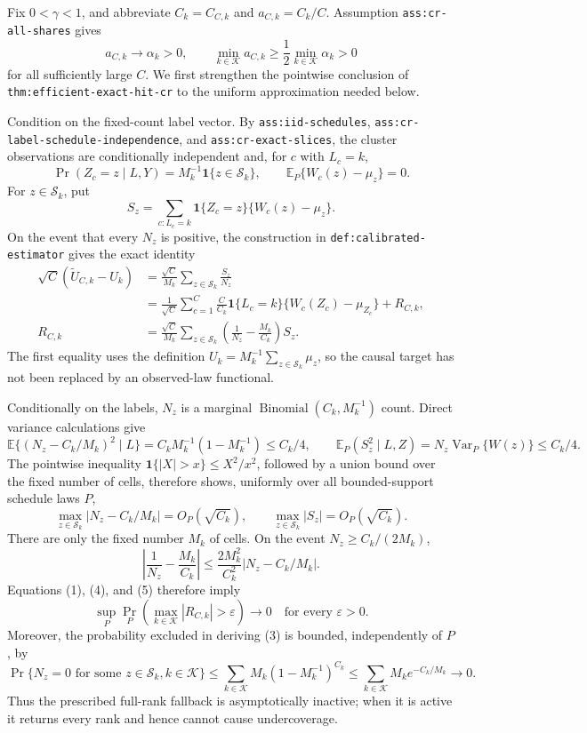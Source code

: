 Fix \(0<\gamma<1\), and abbreviate \(C_k=C_{C,k}\) and \(a_{C,k}=C_k/C\).  Assumption \texttt{ass:cr-all-shares} gives
\[
 a_{C,k}\longrightarrow\alpha_k>0,
 \qquad
 \min_{k\in\mathcal K}a_{C,k}\geq \frac12\min_{k\in\mathcal K}\alpha_k>0
 \tag{1}
\]
for all sufficiently large \(C\).  We first strengthen the pointwise conclusion of \texttt{thm:efficient-exact-hit-cr} to the uniform approximation needed below.

Condition on the fixed-count label vector.  By \texttt{ass:iid-schedules}, \texttt{ass:cr-label-schedule-independence}, and \texttt{ass:cr-exact-slices}, the cluster observations are conditionally independent and, for \(c\) with \(L_c=k\),
\[
 \Pr(Z_c=z\mid L,Y)=M_k^{-1}\mathbf 1\{z\in\mathcal S_k\},
 \qquad
 \mathbb E_P\{W_c(z)-\mu_z\}=0.
 \tag{2}
\]
For \(z\in\mathcal S_k\), put
\[
 S_z=\sum_{c:L_c=k}\mathbf 1\{Z_c=z\}\{W_c(z)-\mu_z\}.
\]
On the event that every \(N_z\) is positive, the construction in \texttt{def:calibrated-estimator} gives the exact identity
\[
 \begin{split}
 \sqrt C(\widetilde U_{C,k}-U_k)
 &=\frac{\sqrt C}{M_k}\sum_{z\in\mathcal S_k}\frac{S_z}{N_z}\\
 &=\frac1{\sqrt C}\sum_{c=1}^C
       \frac{C}{C_k}\mathbf 1\{L_c=k\}
       \{W_c(Z_c)-\mu_{Z_c}\}+R_{C,k},                                      \tag{3}\\
 R_{C,k}
 &=\frac{\sqrt C}{M_k}\sum_{z\in\mathcal S_k}
       \left(\frac1{N_z}-\frac{M_k}{C_k}\right)S_z .                         \tag{4}
 \end{split}
\]
The first equality uses the definition \(U_k=M_k^{-1}\sum_{z\in\mathcal S_k}\mu_z\), so the causal target has not been replaced by an observed-law functional.

Conditionally on the labels, \(N_z\) is a marginal \(\operatorname{Binomial}(C_k,M_k^{-1})\) count.  Direct variance calculations give
\[
 \mathbb E\{(N_z-C_k/M_k)^2\mid L\}
 =C_kM_k^{-1}(1-M_k^{-1})\leq C_k/4,
 \qquad
 \mathbb E_P(S_z^2\mid L,Z)=N_z\operatorname{Var}_P\{W(z)\}\leq C_k/4.
\]
The pointwise inequality \(\mathbf 1\{|X|>x\}\leq X^2/x^2\), followed by a union bound over the fixed number of cells, therefore shows, uniformly over all bounded-support schedule laws \(P\),
\[
 \max_{z\in\mathcal S_k}|N_z-C_k/M_k|=O_P(\sqrt{C_k}),
 \qquad
 \max_{z\in\mathcal S_k}|S_z|=O_P(\sqrt{C_k}).                               \tag{5}
\]
There are only the fixed number \(M_k\) of cells.  On the event \(N_z\geq C_k/(2M_k)\),
\[
 \left|\frac1{N_z}-\frac{M_k}{C_k}\right|
 \leq \frac{2M_k^2}{C_k^2}|N_z-C_k/M_k|.
\]
Equations (1), (4), and (5) therefore imply
\[
 \sup_{P}\Pr_P\!\left(\max_{k\in\mathcal K}|R_{C,k}|>\varepsilon\right)
 \longrightarrow0
 \quad\text{for every }\varepsilon>0.                                        \tag{6}
\]
Moreover, the probability excluded in deriving (3) is bounded, independently of \(P\), by
\[
 \Pr\{N_z=0\text{ for some }z\in\mathcal S_k, k\in\mathcal K\}
 \leq\sum_{k\in\mathcal K}M_k(1-M_k^{-1})^{C_k}
 \leq\sum_{k\in\mathcal K}M_k e^{-C_k/M_k}\longrightarrow0.                \tag{7}
\]
Thus the prescribed full-rank fallback is asymptotically inactive; when it is active it returns every rank and hence cannot cause undercoverage.

